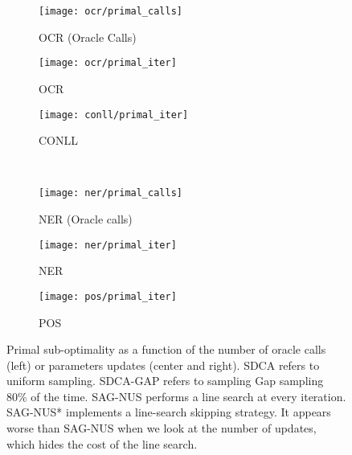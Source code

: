 \begin{figure}[t]
	\centering
	\begin{subfigure}{0.33\linewidth}
		\centering
		\texttt{[image: ocr/primal\_calls]}
		\caption{OCR (Oracle Calls)}\label{fig:OCR oracles}
	\end{subfigure}%
	\begin{subfigure}{0.33\linewidth}
		\centering
		\texttt{[image: ocr/primal\_iter]}
		\caption{OCR}\label{fig:OCR}
	\end{subfigure}%
	\begin{subfigure}{0.33\linewidth}
		\centering
		\texttt{[image: conll/primal\_iter]}
		\caption{CONLL}\label{fig:CONLL}
	\end{subfigure} \\
	\begin{subfigure}{0.33\linewidth}
		\centering
		\texttt{[image: ner/primal\_calls]}
		\caption{NER (Oracle calls)}\label{fig:NER oracles}
	\end{subfigure}%
	\begin{subfigure}{0.33\linewidth}
		\centering
		\texttt{[image: ner/primal\_iter]}
		\caption{NER}\label{fig:NER}
	\end{subfigure}%
	\begin{subfigure}{0.33\linewidth}
		\centering
		\texttt{[image: pos/primal\_iter]}
		\caption{POS}\label{fig:POS}
	\end{subfigure}%
	\caption[Comparison of SDCA, SAG and OEG on 4 datasets]{Primal sub-optimality as a function of the number of oracle calls (left) or parameters updates (center and right).
		SDCA refers to uniform sampling.
		SDCA-GAP refers to sampling Gap sampling 80\% of the time.
		SAG-NUS performs a line search at every iteration.
		SAG-NUS* implements a line-search skipping strategy.
		It appears worse than SAG-NUS when we look at the number of updates, which hides the cost of the line search.
	}
	\label{fig:comparison with SAG and OEG}
\end{figure}

